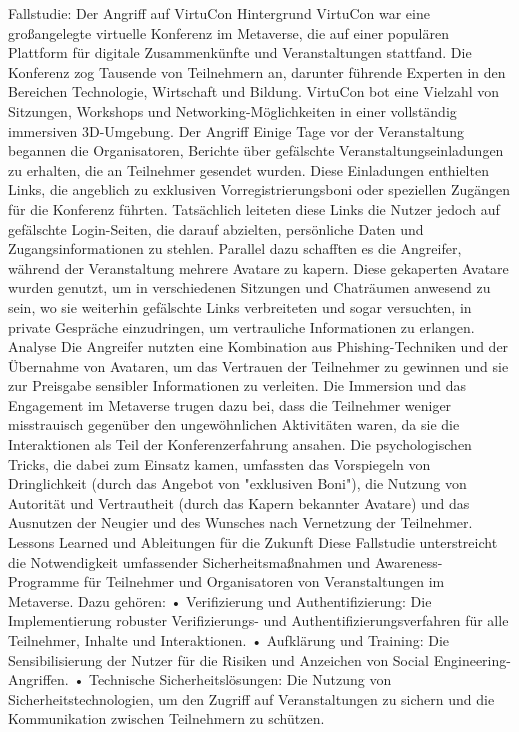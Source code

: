 Fallstudie: Der Angriff auf VirtuCon
Hintergrund
VirtuCon war eine großangelegte virtuelle Konferenz im Metaverse, die auf einer populären Plattform für digitale Zusammenkünfte und Veranstaltungen stattfand. Die Konferenz zog Tausende von Teilnehmern an, darunter führende Experten in den Bereichen Technologie, Wirtschaft und Bildung. VirtuCon bot eine Vielzahl von Sitzungen, Workshops und Networking-Möglichkeiten in einer vollständig immersiven 3D-Umgebung.
Der Angriff
Einige Tage vor der Veranstaltung begannen die Organisatoren, Berichte über gefälschte Veranstaltungseinladungen zu erhalten, die an Teilnehmer gesendet wurden. Diese Einladungen enthielten Links, die angeblich zu exklusiven Vorregistrierungsboni oder speziellen Zugängen für die Konferenz führten. Tatsächlich leiteten diese Links die Nutzer jedoch auf gefälschte Login-Seiten, die darauf abzielten, persönliche Daten und Zugangsinformationen zu stehlen.
Parallel dazu schafften es die Angreifer, während der Veranstaltung mehrere Avatare zu kapern. Diese gekaperten Avatare wurden genutzt, um in verschiedenen Sitzungen und Chaträumen anwesend zu sein, wo sie weiterhin gefälschte Links verbreiteten und sogar versuchten, in private Gespräche einzudringen, um vertrauliche Informationen zu erlangen.
Analyse
Die Angreifer nutzten eine Kombination aus Phishing-Techniken und der Übernahme von Avataren, um das Vertrauen der Teilnehmer zu gewinnen und sie zur Preisgabe sensibler Informationen zu verleiten. Die Immersion und das Engagement im Metaverse trugen dazu bei, dass die Teilnehmer weniger misstrauisch gegenüber den ungewöhnlichen Aktivitäten waren, da sie die Interaktionen als Teil der Konferenzerfahrung ansahen.
Die psychologischen Tricks, die dabei zum Einsatz kamen, umfassten das Vorspiegeln von Dringlichkeit (durch das Angebot von "exklusiven Boni"), die Nutzung von Autorität und Vertrautheit (durch das Kapern bekannter Avatare) und das Ausnutzen der Neugier und des Wunsches nach Vernetzung der Teilnehmer.
Lessons Learned und Ableitungen für die Zukunft
Diese Fallstudie unterstreicht die Notwendigkeit umfassender Sicherheitsmaßnahmen und Awareness-Programme für Teilnehmer und Organisatoren von Veranstaltungen im Metaverse. Dazu gehören:
	• Verifizierung und Authentifizierung: Die Implementierung robuster Verifizierungs- und Authentifizierungsverfahren für alle Teilnehmer, Inhalte und Interaktionen.
	• Aufklärung und Training: Die Sensibilisierung der Nutzer für die Risiken und Anzeichen von Social Engineering-Angriffen.
	• Technische Sicherheitslösungen: Die Nutzung von Sicherheitstechnologien, um den Zugriff auf Veranstaltungen zu sichern und die Kommunikation zwischen Teilnehmern zu schützen.
